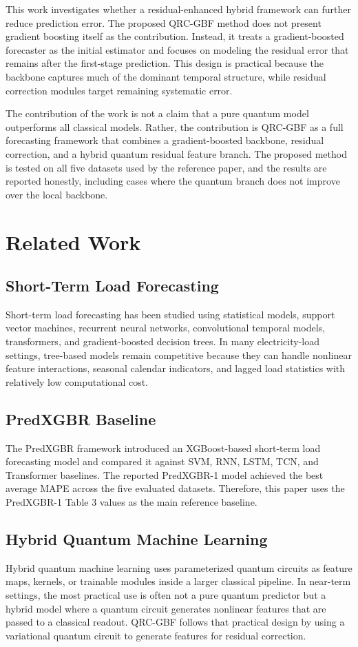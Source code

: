 \documentclass[11pt]{article}
\begin{document}
This work investigates whether a residual-enhanced hybrid framework can further reduce prediction error. The proposed QRC-GBF method does not present gradient boosting itself as the contribution. Instead, it treats a gradient-boosted forecaster as the initial estimator and focuses on modeling the residual error that remains after the first-stage prediction. This design is practical because the backbone captures much of the dominant temporal structure, while residual correction modules target remaining systematic error.

The contribution of the work is not a claim that a pure quantum model outperforms all classical models. Rather, the contribution is QRC-GBF as a full forecasting framework that combines a gradient-boosted backbone, residual correction, and a hybrid quantum residual feature branch. The proposed method is tested on all five datasets used by the reference paper, and the results are reported honestly, including cases where the quantum branch does not improve over the local backbone.

\section{Related Work}
\subsection{Short-Term Load Forecasting}
Short-term load forecasting has been studied using statistical models, support vector machines, recurrent neural networks, convolutional temporal models, transformers, and gradient-boosted decision trees. In many electricity-load settings, tree-based models remain competitive because they can handle nonlinear feature interactions, seasonal calendar indicators, and lagged load statistics with relatively low computational cost.

\subsection{PredXGBR Baseline}
The PredXGBR framework introduced an XGBoost-based short-term load forecasting model and compared it against SVM, RNN, LSTM, TCN, and Transformer baselines. The reported PredXGBR-1 model achieved the best average MAPE across the five evaluated datasets. Therefore, this paper uses the PredXGBR-1 Table 3 values as the main reference baseline.

\subsection{Hybrid Quantum Machine Learning}
Hybrid quantum machine learning uses parameterized quantum circuits as feature maps, kernels, or trainable modules inside a larger classical pipeline. In near-term settings, the most practical use is often not a pure quantum predictor but a hybrid model where a quantum circuit generates nonlinear features that are passed to a classical readout. QRC-GBF follows that practical design by using a variational quantum circuit to generate features for residual correction.
\end{document}
